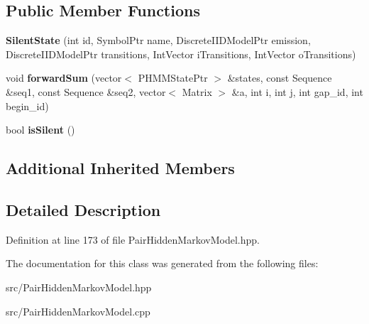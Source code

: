\subsection*{Public Member Functions}
\begin{DoxyCompactItemize}
\item 
\mbox{\label{classtops_1_1SilentState_a461457a6d899ba1c84befdbe81f7e5ab}} 
{\bfseries Silent\+State} (int id, Symbol\+Ptr name, Discrete\+I\+I\+D\+Model\+Ptr emission, Discrete\+I\+I\+D\+Model\+Ptr transitions, Int\+Vector i\+Transitions, Int\+Vector o\+Transitions)
\item 
\mbox{\label{classtops_1_1SilentState_a38d1bc87e0ead383322159e1f427739b}} 
void {\bfseries forward\+Sum} (vector$<$ P\+H\+M\+M\+State\+Ptr $>$ \&states, const Sequence \&seq1, const Sequence \&seq2, vector$<$ Matrix $>$ \&a, int i, int j, int gap\+\_\+id, int begin\+\_\+id)
\item 
\mbox{\label{classtops_1_1SilentState_a1fc08d0470b9e670d8ce4bdbad2c430a}} 
bool {\bfseries is\+Silent} ()
\end{DoxyCompactItemize}
\subsection*{Additional Inherited Members}


\subsection{Detailed Description}


Definition at line 173 of file Pair\+Hidden\+Markov\+Model.\+hpp.



The documentation for this class was generated from the following files\+:\begin{DoxyCompactItemize}
\item 
src/Pair\+Hidden\+Markov\+Model.\+hpp\item 
src/Pair\+Hidden\+Markov\+Model.\+cpp\end{DoxyCompactItemize}
